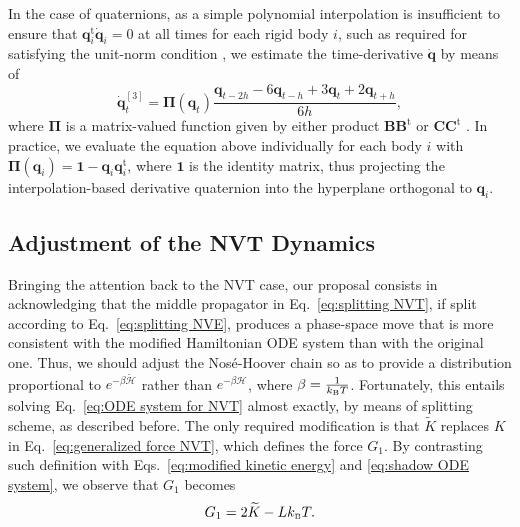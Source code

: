 \documentclass[
journal=jctcce,
layout=twocolumn
]{achemso}
\newcommand{\mt}[1]{\boldsymbol{\mathbf{#1}}}   %
\newcommand{\vt}[1]{\boldsymbol{\mathbf{#1}}}   %
\newcommand{\tr}[1]{#1^\text{t}}                %
\newcommand{\Ham}[1]{{\mathcal H}_\text{#1}}    %
\newcommand{\timestep}{h}
\newcommand{\modified}[1]{\widetilde{#1}}
\begin{document}
In the case of quaternions, as a simple polynomial interpolation is insufficient to ensure that $\tr{\vt q}_i \dot{\vt q}_i = 0$ at all times for each rigid body $i$, such as required for satisfying the unit-norm condition \cite{Silveira_2017}, we estimate the time-derivative $\dot{\vt q}$ by means of\cite{Schay_1995}
\begin{equation*}
\dot{\vt q}^{[3]}_t = {\mt \Pi}({\vt q}_t) \frac{{\vt q}_{t-2\timestep} - 6 {\vt q}_{t-\timestep} + 3 {\vt q}_t + 2 {\vt q}_{t+\timestep}}{6\timestep},
\end{equation*}
where ${\mt \Pi}$ is a matrix-valued function given by either product ${\mt B}\tr{\mt B}$ or ${\mt C}\tr{\mt C}$ \cite{Silveira_2017}.
In practice, we evaluate the equation above individually for each body $i$ with ${\mt \Pi}({\vt q}_i) = {\mt 1} - {\vt q}_i \tr{\vt q}_i$, where $\mt 1$ is the identity matrix, thus projecting the interpolation-based derivative quaternion into the hyperplane orthogonal to ${\vt q}_i$.

\subsection{Adjustment of the NVT Dynamics}
\label{sec:smttk}
Bringing the attention back to the NVT case, our proposal consists in acknowledging that the middle propagator in Eq.~\eqref{eq:splitting NVT}, if split according to Eq.~\eqref{eq:splitting NVE}, produces a phase-space move that is more consistent with the modified Hamiltonian ODE system than with the original one.
Thus, we should adjust the Nos\'e-Hoover chain so as to provide a distribution proportional to $e^{-\beta \modified{\Ham{}}}$ rather than $e^{-\beta \Ham{}}$, where $\beta = \frac{1}{k_\text{\tiny B} T}$.
Fortunately, this entails solving Eq.~\eqref{eq:ODE system for NVT} almost exactly, by means of splitting scheme, as described before.
The only required modification is that $\modified K$ replaces $K$ in Eq.~\eqref{eq:generalized force NVT}, which defines the force $G_1$.
By contrasting such definition with Eqs.~\eqref{eq:modified kinetic energy} and \eqref{eq:shadow ODE system}, we observe that $G_1$ becomes
\begin{equation}
\label{eq:thermostat_force}
G_1 = 2 \modified K - L k_\text{\tiny B} T.
\end{equation}
\end{document}
